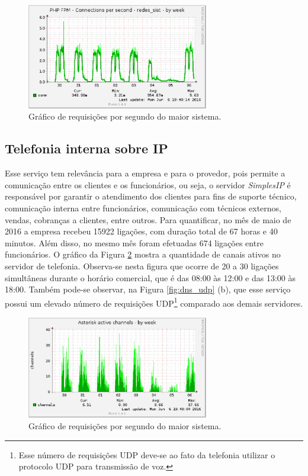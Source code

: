 
\begin{figure}[h!]
 \centering
 \includegraphics[width=300px]{img/soldi_week.eps}
 \caption{Gráfico de requisições por segundo do maior sistema.}
 \label{fig:soldi_week}
\end{figure}

\newpage
\subsection{Telefonia interna sobre IP}
\label{section:telefonia}

Esse serviço tem relevância para a empresa e para o provedor, pois permite a comunicação entre os clientes e os funcionários, ou seja, o 
servidor \textit{SimplesIP} é responsável por garantir o atendimento dos clientes para fins de suporte técnico, comunicação interna entre 
funcionários, comunicação com técnicos externos, vendas, cobranças a clientes, entre outros. Para quantificar, no mês de maio de 2016 a empresa 
recebeu 15922 ligações, com duração total de 67 horas e 40 minutos. Além disso, no mesmo mês foram efetuadas 674 ligações entre funcionários. 
O gráfico da Figura \ref{fig:simplesip_week} mostra a quantidade de canais ativos no servidor de telefonia. Observa-se nesta figura que ocorre 
de 20 a 30 ligações simultâneas durante o horário comercial, que é das 08:00 às 12:00 e das 13:00 às 18:00. Também pode-se observar, na Figura 
\ref{fig:dns_udp} (b), que esse serviço possui um elevado número de requisições \ac{UDP}\footnote[1]{Esse número de requisições \ac{UDP} 
deve-se ao fato da telefonia utilizar o protocolo \ac{UDP} para transmissão de voz.} comparado aos demais servidores.

\begin{figure}[h!]
 \centering
 \includegraphics[width=300px]{img/simplesip_week.eps}
 \caption{Gráfico de requisições por segundo do maior sistema.}
 \label{fig:simplesip_week}
\end{figure}

